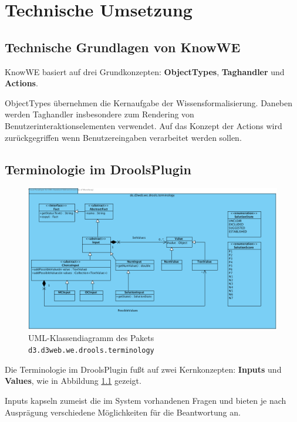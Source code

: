 \documentclass[a4paper,12pt]{report}
\begin{document}
  \chapter{Technische Umsetzung}

  \section{Technische Grundlagen von KnowWE}

KnowWE basiert auf drei Grundkonzepten: \textbf{ObjectTypes}, \textbf{Taghandler} und \textbf{Actions}.

ObjectTypes übernehmen die Kernaufgabe der Wissensformalisierung. Daneben werden Taghandler insbesondere 
zum Rendering von Benutzerinteraktionselementen verwendet. Auf das Konzept der Actions wird zurückgegriffen 
wenn Benutzereingaben verarbeitet werden sollen.

  \section{Terminologie im DroolsPlugin}
  
  \begin{figure}[htbp]
    \centering
      \includegraphics[width=\textwidth]{img/Terminologie.png}
    \caption{UML-Klassendiagramm des Pakets \texttt{d3.d3web.we.drools.terminology}}
    \label{fig:uml_terminology}
  \end{figure}
  
Die Terminologie im DroolsPlugin fußt auf zwei Kernkonzepten: \textbf{Inputs} und \textbf{Values}, wie in Abbildung \ref{fig:uml_terminology} gezeigt.

Inputs kapseln zumeist die im System vorhandenen Fragen und bieten je nach Ausprägung verschiedene Möglichkeiten für die Beantwortung an.
\end{document}
